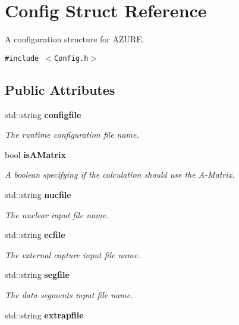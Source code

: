 \section{Config Struct Reference}
\label{structConfig}
A configuration structure for AZURE.  


{\tt \#include $<$Config.h$>$}

\subsection*{Public Attributes}
\begin{CompactItemize}
\item 
std::string \bf{configfile}\label{structConfig_f3049a94f812691bde9bc978554215da}

\begin{CompactList}\small\item\em The runtime configuration file name. \item\end{CompactList}\item 
bool \bf{is\-AMatrix}\label{structConfig_9d4e0f3c8f825552f5dd8c0c64449a97}

\begin{CompactList}\small\item\em A boolean specifying if the calculation should use the A-Matrix. \item\end{CompactList}\item 
std::string \bf{nucfile}\label{structConfig_6d9d9f1b6bef23879b7786ae511b4bbd}

\begin{CompactList}\small\item\em The nuclear input file name. \item\end{CompactList}\item 
std::string \bf{ecfile}\label{structConfig_85061e48a6ce3f509bb17669ae66289a}

\begin{CompactList}\small\item\em The external capture input file name. \item\end{CompactList}\item 
std::string \bf{segfile}\label{structConfig_c4e0e3319befab323b74c88d1a258d54}

\begin{CompactList}\small\item\em The data segments input file name. \item\end{CompactList}\item 
std::string \bf{extrapfile}\label{structConfig_9a025c9c94905aa016118619f94d7987}


\end{CompactItemize}
